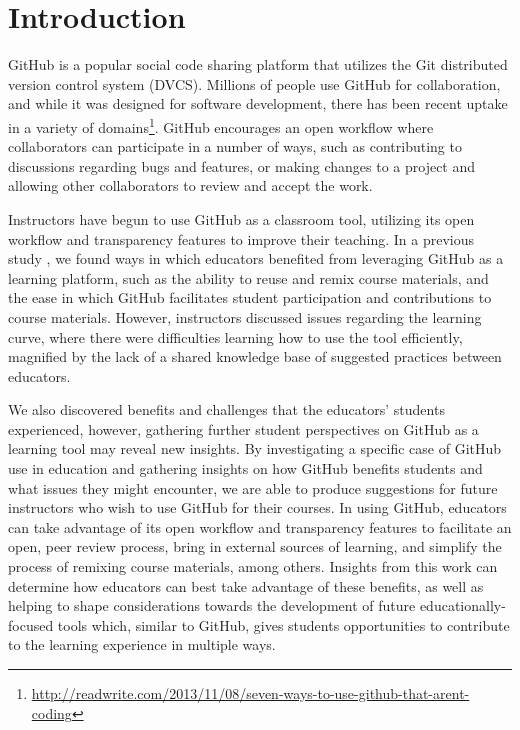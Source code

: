 \section{Introduction}


GitHub is a popular social code sharing platform that utilizes the Git distributed version control system (DVCS). Millions of people use GitHub for collaboration, and while it was designed for software development, there has been recent uptake in a variety of domains\footnote{\url{http://readwrite.com/2013/11/08/seven-ways-to-use-github-that-arent-coding}}. GitHub encourages an open workflow where collaborators can participate in a number of ways, such as contributing to discussions regarding bugs and features, or making changes to a project and allowing other collaborators to review and accept the work.

Instructors have begun to use GitHub as a classroom tool, utilizing its open workflow and transparency features to improve their teaching. In a previous study \cite{zagalsky2015emergence}, we found ways in which educators benefited from leveraging GitHub as a learning platform, such as the ability to reuse and remix course materials, and the ease in which GitHub facilitates student participation and contributions to course materials. However, instructors discussed issues regarding the learning curve, where there were difficulties learning how to use the tool efficiently, magnified by the lack of a shared knowledge base of suggested practices between educators.

We also discovered benefits and challenges that the educators' students experienced, however, gathering further student perspectives on GitHub as a learning tool may reveal new insights. By investigating a specific case of GitHub use in education and gathering insights on how GitHub benefits students and what issues they might encounter, we are able to produce suggestions for future instructors who wish to use GitHub for their courses. In using GitHub, educators can take advantage of its open workflow and transparency features to facilitate an open, peer review process, bring in external sources of learning, and simplify the process of remixing course materials, among others. Insights from this work can determine how educators can best take advantage of these benefits, as well as helping to shape considerations towards the development of future educationally-focused tools which, similar to GitHub, gives students opportunities to contribute to the learning experience in multiple ways.


